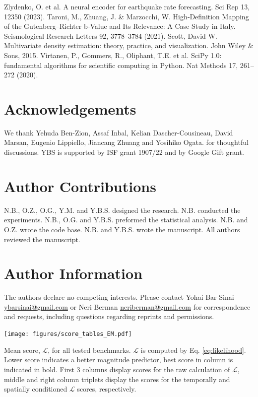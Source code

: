 \documentclass[pdflatex]{sn-jnl}
\begin{document}
\newpage
\renewcommand\refname{Methods References}
\begin{thebibliography}{10}
Zlydenko, O. et al. A neural encoder for earthquake rate forecasting. Sci Rep 13, 12350 (2023).
Taroni, M., Zhuang, J. \& Marzocchi, W. High‐Definition Mapping of the Gutenberg–Richter b‐Value and Its Relevance: A Case Study in Italy. Seismological Research Letters 92, 3778–3784 (2021).
Scott, David W. Multivariate density estimation: theory, practice, and visualization. John Wiley \& Sons, 2015.  
Virtanen, P., Gommers, R., Oliphant, T.E. et al. SciPy 1.0: fundamental algorithms for scientific computing in Python. Nat Methods 17, 261–272 (2020).





\end{thebibliography}


\newpage
\section*{Acknowledgements}
We thank Yehuda Ben-Zion, Assaf Inbal, Kelian Dascher-Cousineau, David Marsan, Eugenio Lippiello, Jiancang Zhuang and Yosihiko Ogata. for thoughtful discussions. YBS is supported by ISF grant 1907/22 and by Google Gift grant.

\section*{Author Contributions}
N.B., O.Z., O.G., Y.M. and Y.B.S. designed the research. N.B. conducted the experiments. N.B., O.G. and Y.B.S. preformed the statistical analysis. N.B. and O.Z. wrote the code base. N.B. and Y.B.S. wrote the manuscript. All authors reviewed the manuscript.

\section*{Author Information}
The authors declare no competing interests. Please contact Yohai Bar-Sinai \href{mailto:ybarsinai@gmail.com}{ybarsinai@gmail.com} or Neri Berman \href{mailto:neriberman@gmail.com}{neriberman@gmail.com} for correspondence and requests, including questions regarding reprints and permissions.


\newpage
\begin{table}[h!]
    \centering
    \texttt{[image: figures/score\_tables\_EM.pdf]}
    \caption{Mean score, $\mathcal{L}$, for all tested benchmarks. $\mathcal{L}$ is computed by Eq. \ref{eq:likelihood}. Lower score indicates a better magnitude predictor, best score in column is indicated in bold. First 3 columns display scores for the raw calculation of $\mathcal{L}$, middle and right column triplets display the scores for the temporally and spatially conditioned $\mathcal{L}$ scores, respectively.
    }
    \label{tab:mean_ll_all_benchmarks}
\end{table}
\end{document}
